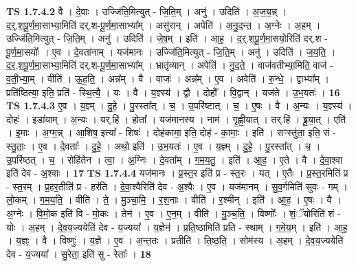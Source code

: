 \documentclass[17pt]{extarticle}
\begin{document}
                  \newline
                                \textbf{ TS 1.7.4.2} \newline
                  वै । दे॒वाः । उज्जि॑ति॒मित्युत् - जि॒ति॒म् । अनु॑ । उदिति॑ । अ॒ज॒य॒न्न् । द॒र्॒.श॒पू॒र्ण॒मा॒साभ्या॒मिति॑ दर्.श-पू॒र्ण॒मा॒साभ्या᳚म् । असु॑रान् । अपेति॑ । अ॒नु॒द॒न्त॒ । अ॒ग्नेः । अ॒हम् । उज्जि॑ति॒मित्युत् - जि॒ति॒म् । अनु॑ । उदिति॑ । जे॒ष॒म् । इति॑ । आ॒ह॒ । द॒र्॒.श॒पू॒र्ण॒मा॒सयो॒रिति॑ दर्.श - पू॒र्ण॒मा॒सयोः᳚ । ए॒व । दे॒वता॑नाम् । यज॑मानः । उज्जि॑ति॒मित्युत् - जि॒ति॒म् । अनु॑ । उदिति॑ । ज॒य॒ति॒ । द॒र॒.श॒पू॒र्ण॒मा॒साभ्या॒मिति॑ दर्.श-पू॒र्ण॒मा॒साभ्या᳚म् । भ्रातृ॑व्यान् । अपेति॑ । नु॒द॒ते॒ । वाज॑वतीभ्या॒मिति॒ वाज॑ - व॒ती॒भ्या॒म् । वीति॑ । ऊ॒ह॒ति॒ । अन्न᳚म् । वै । वाजः॑ । अन्न᳚म् । ए॒व । अवेति॑ । रु॒न्धे॒ । द्वाभ्या᳚म् । प्रति॑ष्ठित्या॒ इति॒ प्रति॑ - स्थि॒त्यै॒ । यः । वै । य॒ज्ञ्स्य॑ । द्वौ । दोहौ᳚ । वि॒द्वान् । यज॑ते । उ॒भ॒यतः॑ । \textbf{  16} \newline
                  \newline
                                \textbf{ TS 1.7.4.3} \newline
                  ए॒व । य॒ज्ञ्म् । दु॒हे॒ । पु॒रस्ता᳚त् । च॒ । उ॒परि॑ष्टात् । च॒ । ए॒षः । वै । अ॒न्यः । य॒ज्ञ्स्य॑ । दोहः॑ । इडा॑याम् । अ॒न्यः । यर्.हि॑ । होता᳚ । यज॑मानस्य । नाम॑ । गृ॒ह्णी॒यात् । तर्.हि॑ । ब्रू॒या॒त् । एति॑ । इ॒माः । अ॒ग्म॒न्न् । आ॒शिष॒ इत्या᳚ - शिषः॑ । दोह॑कामा॒ इति॒ दोह॑ - का॒माः॒ । इति॑ । सꣳस्तु॑ता॒ इति॒ सं - स्तु॒ताः॒ । ए॒व । दे॒वताः᳚ । दु॒हे॒ । अथो॒ इति॑ । उ॒भ॒यतः॑ । ए॒व । य॒ज्ञ्म् । दु॒हे॒ । पु॒रस्ता᳚त् । च॒ । उ॒परि॑ष्ठत् । च॒ । रोहि॑तेन । त्वा॒ । अ॒ग्निः । दे॒वता᳚म् । ग॒म॒य॒तु॒ । इति॑ । आ॒ह॒ । ए॒ते । वै । दे॒वा॒श्वा इति॑ देव - अ॒श्वाः । \textbf{  17} \newline
                  \newline
                                \textbf{ TS 1.7.4.4} \newline
                  यज॑मानः । प्र॒स्त॒र इति॑ प्र - स्त॒रः । यत् । ए॒तैः । प्र॒स्त॒रमिति॑ प्र - स्त॒रम् । प्र॒हर॒तीति॑ प्र - हर॑ति । दे॒वा॒श्वैरिति॑ देव - अ॒श्वैः । ए॒व । यज॑मानम् । सु॒व॒र्गमिति॑ सुवः - गम् । लो॒कम् । ग॒म॒य॒ति॒ । वीति॑ । ते॒ । मु॒ञ्चा॒मि॒ । र॒श॒नाः । वीति॑ । र॒श्मीन् । इति॑ । आ॒ह॒ । ए॒षः । वै । अ॒ग्नेः । वि॒मो॒क इति॑ वि - मो॒कः । तेन॑ । ए॒व । ए॒न॒म् । वीति॑ । मु॒ञ्च॒ति॒ । विष्णोः᳚ । शं॒ॅयोरिति॑ शं - योः । अ॒हम् । दे॒व॒य॒ज्ययेति॑ देव - य॒ज्यया᳚ । य॒ज्ञेन॑ । प्र॒ति॒ष्ठामिति॑ प्रति - स्थाम् । ग॒मे॒य॒म् । इति॑ । आ॒ह॒ । य॒ज्ञ्ः । वै । विष्णुः॑ । य॒ज्ञे । ए॒व । अ॒न्त॒तः । प्रतीति॑ । ति॒ष्ठ॒ति॒ । सोम॑स्य । अ॒हम् । दे॒व॒य॒ज्ययेति॑ देव - य॒ज्यया᳚ । सु॒रेता॒ इति॑ सु - रेताः᳚ । \textbf{  18} \newline
\end{document}
